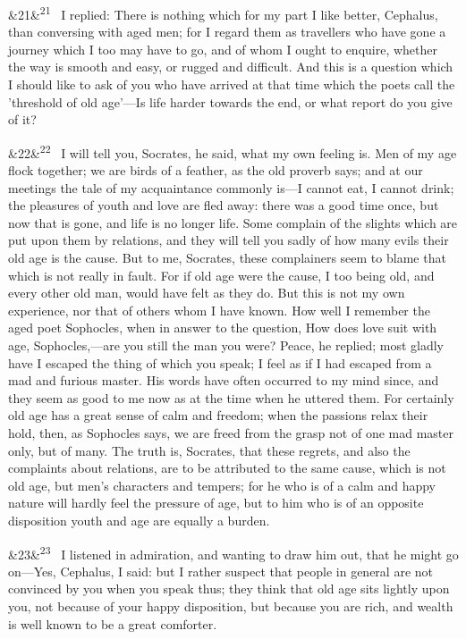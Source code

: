\documentclass[12pt]{article}
\newcommand{\para}[1][]{\par\noindent\ifx&#1&\else\textsuperscript{\footnotesize #1}~\fi}
\begin{document}
\para[21] I replied: There is nothing which for my part I like better, Cephalus, than conversing with aged men; for I regard them as travellers who have gone a journey which I too may have to go, and of whom I ought to enquire, whether the way is smooth and easy, or rugged and difficult. And this is a question which I should like to ask of you who have arrived at that time which the poets call the 'threshold of old age'---Is life harder towards the end, or what report do you give of it?

\para[22] I will tell you, Socrates, he said, what my own feeling is. Men of my age flock together; we are birds of a feather, as the old proverb says; and at our meetings the tale of my acquaintance commonly is---I cannot eat, I cannot drink; the pleasures of youth and love are fled away: there was a good time once, but now that is gone, and life is no longer life. Some complain of the slights which are put upon them by relations, and they will tell you sadly of how many evils their old age is the cause. But to me, Socrates, these complainers seem to blame that which is not really in fault. For if old age were the cause, I too being old, and every other old man, would have felt as they do. But this is not my own experience, nor that of others whom I have known. How well I remember the aged poet Sophocles, when in answer to the question, How does love suit with age, Sophocles,---are you still the man you were? Peace, he replied; most gladly have I escaped the thing of which you speak; I feel as if I had escaped from a mad and furious master. His words have often occurred to my mind since, and they seem as good to me now as at the time when he uttered them. For certainly old age has a great sense of calm and freedom; when the passions relax their hold, then, as Sophocles says, we are freed from the grasp not of one mad master only, but of many. The truth is, Socrates, that these regrets, and also the complaints about relations, are to be attributed to the same cause, which is not old age, but men's characters and tempers; for he who is of a calm and happy nature will hardly feel the pressure of age, but to him who is of an opposite disposition youth and age are equally a burden.

\para[23] I listened in admiration, and wanting to draw him out, that he might go on---Yes, Cephalus, I said: but I rather suspect that people in general are not convinced by you when you speak thus; they think that old age sits lightly upon you, not because of your happy disposition, but because you are rich, and wealth is well known to be a great comforter.
\end{document}
